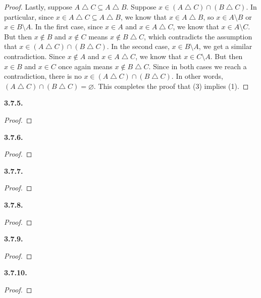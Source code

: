\documentclass[12pt]{amsart}
\newenvironment{statement}[1]{\smallskip\noindent\color[rgb]{.6627, .3529, .6314} {\bf #1.}}{}
\theoremstyle{definition}
\theoremstyle{remark}
\begin{document}
\begin{proof}
Lastly, suppose $A \bigtriangleup C \subseteq A \bigtriangleup B$.
Suppose $x \in (A \bigtriangleup C) \cap (B \bigtriangleup C)$.
In particular, since $x \in A \bigtriangleup C \subseteq A \bigtriangleup B$, we know that $x \in A \bigtriangleup B$, so $x \in A \setminus B$ or $x \in B \setminus A$.
In the first case, since $x \in A$ and $x \in A \bigtriangleup C$, we know that $x \in A \setminus C$.
But then $x \notin B$ and $x \notin C$ means $x \notin B \bigtriangleup C$, which contradicts the assumption that $x \in (A \bigtriangleup C) \cap (B \bigtriangleup C)$.
In the second case, $x \in B \setminus A$, we get a similar contradiction.
Since $x \notin A$ and $x \in A \bigtriangleup C$, we know that $x \in C \setminus A$.
But then $x \in B$ and $x \in C$ once again means $x \notin B \bigtriangleup C$.
Since in both cases we reach a contradiction, there is no $x \in (A \bigtriangleup C) \cap (B \bigtriangleup C)$.
In other words, $(A \bigtriangleup C) \cap (B \bigtriangleup C) = \varnothing$.
This completes the proof that (3) implies (1).
\end{proof}


\begin{statement}{3.7.5}
\end{statement}

\begin{proof}
\end{proof}


\begin{statement}{3.7.6}
\end{statement}

\begin{proof}
\end{proof}


\begin{statement}{3.7.7}
\end{statement}

\begin{proof}
\end{proof}


\begin{statement}{3.7.8}
\end{statement}

\begin{proof}
\end{proof}


\begin{statement}{3.7.9}
\end{statement}

\begin{proof}
\end{proof}


\begin{statement}{3.7.10}
\end{statement}

\begin{proof}
\end{proof}
\end{document}
